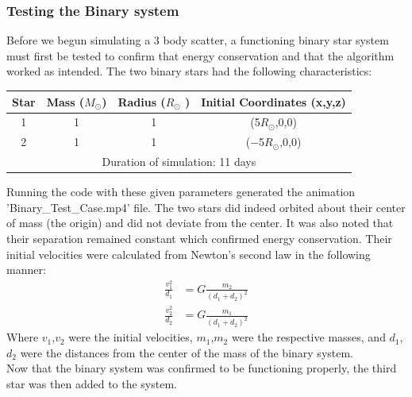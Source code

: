 \documentclass[10pt,letterpaper]{article}
\begin{document}
\subsubsection{Testing the Binary system}
Before we begun simulating a 3 body scatter, a functioning binary star system must first be tested to confirm that energy conservation and that the algorithm worked as intended. The two binary stars had the following characteristics:
\begin{table}[!htb]
\centering
\begin{tabular}{| c | c | c | c |}
\hline
Star & Mass ($M_{\odot}$) & Radius ($R_{\odot}$ ) & Initial Coordinates (x,y,z) \\
\hline
1 & 1 & 1 & (5$R_{\odot}$,0,0) \\
\hline
2 & 1 & 1 & ($-$5$R_{\odot}$,0,0) \\
\hline
\multicolumn{4}{|c|}{Duration of simulation: 11 days} \\
\hline
\end{tabular}
\end{table}
 Running the code with these given parameters generated the animation 'Binary\_Test\_Case.mp4' file. The two stars did indeed orbited about their center of mass (the origin) and did not deviate from the center. It was also noted that their separation remained constant which confirmed energy conservation. Their initial velocities were calculated from Newton's second law in the following manner:
\begin{align}
\frac{v_1^2}{d_1} &= G \frac{m_2}{\left( d_1 + d_2 \right)^2} \\
\frac{v_2^2}{d_2} &= G \frac{m_1}{\left( d_1 + d_2 \right)^2} 
\end{align}
Where $v_1$,$v_2$ were the initial velocities, $m_1$,$m_2$ were the respective masses, and $d_1$,  $d_2$ were the distances from the center of the mass of the binary system.\\[2ex]
Now that the binary system was confirmed to be functioning properly, the third star was then added to the system.
\end{document}
